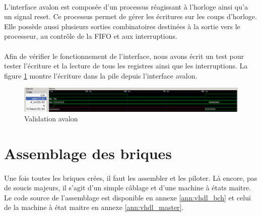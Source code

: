 \documentclass[a4paper, 11pt, svgnames]{report}
\begin{document}
            \paragraph{}
                L'interface avalon est composée d'un processus réagissant à
                l'horloge ainsi qu'a un signal reset.  Ce processus permet de
                gérer les écritures sur les coups d'horloge.  Elle possède
                aussi plusieurs sorties combinatoires destinées à la sortie
                vers le processeur, au contrôle de la FIFO et aux
                interruptions.

            \paragraph{}
                Afin de vérifier le fonctionnement de l'interface, nous avons
                écrit un test pour tester l'écriture et la lecture de tous les
                registres ainsi que les interruptions. La figure
                \ref{fig:sim_avalon} montre l'écriture dans la pile depuis
                l'interface avalon.

                \begin{figure}[H]
                    \centering
                    \includegraphics[width=\textwidth]{./images/avalon_simu}
                    \caption{Validation avalon}
                    \label{fig:sim_avalon}
                \end{figure}

        \section{Assemblage des briques}
            \paragraph{}
                Une fois toutes les briques crées, il faut les assembler et les
                piloter. Là encore, pas de soucis majeurs, il s'agit d'un
                simple câblage et d'une machine à états maitre.  Le code source
                de l'assemblage est disponible en annexe \ref{ann:vhdl_bch} et
                celui de la machine à état maitre en annexe \ref{ann:vhdl_master}.
\end{document}
